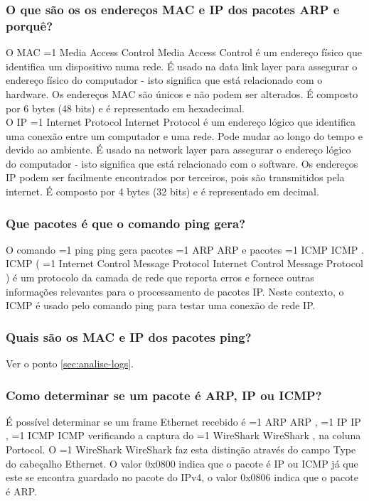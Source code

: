 \documentclass[11pt,a4paper]{article}
\newcommand{\hl}[2][1]{%
  \ifnum#1=1\relax
    \textcolor{text-hl1}{#2}%
  \else
    \textcolor{text-hl2}{#2}%
  \fi
}
\begin{document}
\begin{multicols}{2}
\subsubsection{O que são os os endereços MAC e IP dos pacotes ARP e porquê?}

O MAC \hl{Media Access Control} é um endereço físico que identifica um dispositivo numa rede. É usado na data link layer para assegurar o endereço físico do computador - isto significa que está relacionado com o hardware. Os endereços MAC são únicos e não podem ser alterados. É composto por 6 bytes (48 bits) e é representado em hexadecimal.\\
O IP \hl{Internet Protocol} é um endereço lógico que identifica uma conexão entre um computador e uma rede. Pode mudar ao longo do tempo e devido ao ambiente. É usado na network layer para assegurar o endereço lógico do computador - isto significa que está relacionado com o software. Os endereços IP podem ser facilmente encontrados por terceiros, pois são transmitidos pela internet. É composto por 4 bytes (32 bits) e é representado em decimal.


\subsubsection{Que pacotes é que o comando ping gera?}

O comando \hl{ping} gera pacotes \hl{ARP} e pacotes \hl{ICMP}. ICMP (\hl{Internet Control Message Protocol}) é um protocolo da camada de rede que reporta erros e fornece outras informações relevantes para o processamento de pacotes IP. Neste contexto, o ICMP é usado pelo comando ping para testar uma conexão de rede IP.

\subsubsection{Quais são os MAC e IP dos pacotes ping?}

Ver o ponto \ref{sec:analise-logs}.

\subsubsection{Como determinar se um pacote é ARP, IP ou ICMP?}

É possível determinar se um frame Ethernet recebido é \hl{ARP}, \hl{IP}, \hl{ICMP} verificando a captura do \hl[2]{WireShark}, na coluna Portocol. O \hl[2]{WireShark} faz esta distinção através do campo Type do cabeçalho Ethernet. O valor 0x0800 indica que o pacote é IP ou ICMP já que este se encontra guardado no pacote do IPv4, o valor 0x0806 indica que o pacote é ARP. 


\end{multicols}
\end{document}

